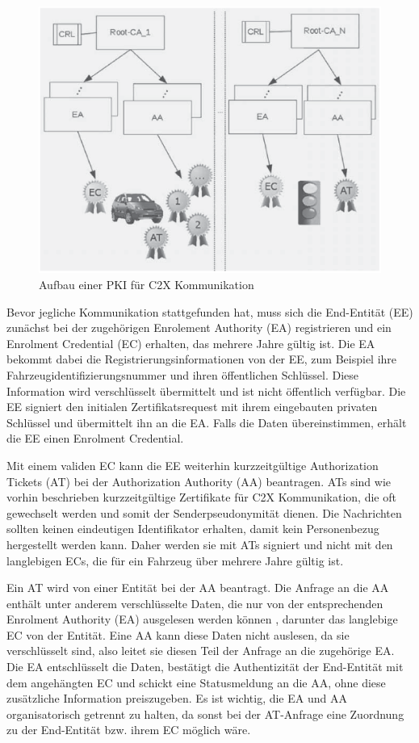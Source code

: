 \begin{figure}
	\centering
	\includegraphics[width=0.7\linewidth]{images/PKI}
	\caption[Aufbau einer PKI für C2X Kommunikation]{Aufbau einer PKI für C2X Kommunikation \footnotemark}
	\label{fig:pki}
\end{figure}

Bevor jegliche Kommunikation stattgefunden hat, muss sich die End-Entität (EE) zunächst bei der zugehörigen Enrolement Authority (EA) registrieren und ein Enrolment Credential (EC) erhalten, das mehrere Jahre gültig ist. Die EA bekommt dabei die Registrierungsinformationen von der EE, zum Beispiel ihre Fahrzeugidentifizierungsnummer und ihren öffentlichen Schlüssel. Diese Information wird verschlüsselt übermittelt und ist nicht öffentlich verfügbar. Die EE signiert den initialen Zertifikatsrequest mit ihrem eingebauten privaten Schlüssel und übermittelt ihn an die EA. Falls die Daten übereinstimmen, erhält die EE einen Enrolment Credential.

Mit einem validen EC kann die EE weiterhin kurzzeitgültige Authorization Tickets (AT) bei der Authorization Authority (AA) beantragen. ATs sind wie vorhin beschrieben kurzzeitgültige Zertifikate für C2X Kommunikation, die oft gewechselt werden und somit der Senderpseudonymität dienen. Die Nachrichten sollten keinen eindeutigen Identifikator erhalten, damit kein Personenbezug hergestellt werden kann. Daher werden sie mit ATs signiert und nicht mit den langlebigen ECs, die für ein Fahrzeug über mehrere Jahre gültig ist. 

Ein AT wird von einer Entität bei der AA beantragt. Die Anfrage an die AA enthält unter anderem verschlüsselte Daten, die nur von der entsprechenden Enrolment Authority (EA) ausgelesen werden können \cite{ETSI2018}, darunter das langlebige EC von der Entität. Eine AA kann diese Daten nicht auslesen, da sie verschlüsselt sind, also leitet sie diesen Teil der Anfrage an die zugehörige EA. Die EA entschlüsselt die Daten, bestätigt die Authentizität der End-Entität mit dem angehängten EC und schickt eine Statusmeldung an die AA, ohne diese zusätzliche Information preiszugeben. Es ist wichtig, die EA und AA organisatorisch getrennt zu halten, da sonst bei der AT-Anfrage eine Zuordnung zu der End-Entität bzw. ihrem EC möglich wäre.

